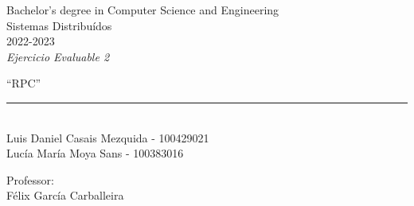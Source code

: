 \begin{titlepage}
    \begin{sffamily}
    \color{azulUC3M}
    \begin{center}
        \begin{figure}[H]
        \end{figure}
        \vspace{1.5cm}
        \begin{Large}
            Bachelor's degree in Computer Science and Engineering\\
            Sistemas Distribuídos\\
            2022-2023\\
            \vspace{2cm}
            \textsl{Ejercicio Evaluable 2}
            \bigskip

        \end{Large}
            {\Huge ``RPC''}\\
            \vspace*{0.5cm}
            \rule{10.5cm}{0.1mm}\\
            \vspace*{0.9cm}
            {\LARGE Luis Daniel Casais Mezquida - 100429021}\\
            \vspace*{0.2cm}
            {\LARGE Lucía María Moya Sans - 100383016}\\
            \vspace*{0.2cm}

            \vspace*{0.8cm}
        \begin{Large}
            Professor:\\
            Félix García Carballeira\\
        \end{Large}
    \end{center}
    \vfill

    \end{sffamily}
\end{titlepage}
